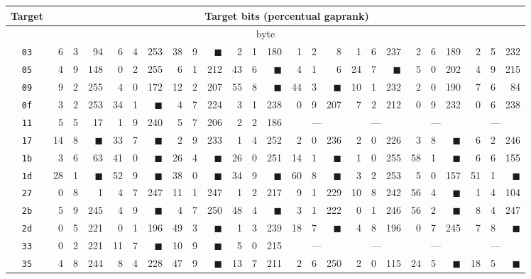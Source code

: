 \begin{tabular}{| c | r@{.} l@{\quad}r | r@{.} l@{\quad}r | r@{.} l@{\quad}r | r@{.} l@{\quad}r | r@{.} l@{\quad}r | r@{.} l@{\quad}r | r@{.} l@{\quad}r | r@{.} l@{\quad}r |}
	\hline
	Target & \multicolumn{24}{c|}{Target bits (percentual gap\quad rank)} \\
	\hline
	\hline
	\multicolumn{25}{|c|}{\nth{1} byte} \\
	\hline
	{\tt 03}&6&3&94&6&4&253&38&9&{$\blacksquare$}&2&1&180&1&2&8&1&6&237&2&6&189&2&5&232\\
	\hline
	{\tt 05}&4&9&148&0&2&255&6&1&212&43&6&{$\blacksquare$}&4&1&6&24&7&{$\blacksquare$}&5&0&202&4&9&215\\
	\hline
	{\tt 09}&9&2&255&4&0&172&12&2&207&55&8&{$\blacksquare$}&44&3&{$\blacksquare$}&10&1&232&2&0&190&7&6&84\\
	\hline
	{\tt 0f}&3&2&253&34&1&{$\blacksquare$}&4&7&224&3&1&238&0&9&207&7&2&212&0&9&232&0&6&238\\
	\hline
	{\tt 11}&5&5&17&1&9&240&5&7&206&2&2&186&\multicolumn{3}{c|}{---}&\multicolumn{3}{c|}{---}&\multicolumn{3}{c|}{---}&\multicolumn{3}{c|}{---}\\
	\hline
	{\tt 17}&14&8&{$\blacksquare$}&33&7&{$\blacksquare$}&2&9&233&1&4&252&2&0&236&2&0&226&3&8&{\weak$\blacksquare$}&6&2&246\\
	\hline
	{\tt 1b}&3&6&63&41&0&{$\blacksquare$}&26&4&{$\blacksquare$}&26&0&251&14&1&{$\blacksquare$}&1&0&255&58&1&{$\blacksquare$}&6&6&155\\
	\hline
	{\tt 1d}&28&1&{$\blacksquare$}&52&9&{$\blacksquare$}&38&0&{$\blacksquare$}&34&9&{$\blacksquare$}&60&8&{$\blacksquare$}&3&2&253&5&0&157&51&1&{$\blacksquare$}\\
	\hline
	{\tt 27}&0&8&1&4&7&247&11&1&247&1&2&217&9&1&229&10&8&242&56&4&{$\blacksquare$}&1&4&104\\
	\hline
	{\tt 2b}&5&9&245&4&9&{\weak$\blacksquare$}&4&7&250&48&4&{$\blacksquare$}&3&1&222&0&1&246&56&2&{$\blacksquare$}&8&4&247\\
	\hline
	{\tt 2d}&0&5&221&0&1&196&49&3&{$\blacksquare$}&1&3&239&18&7&{$\blacksquare$}&4&8&196&0&7&245&7&8&{\weak$\blacksquare$}\\
	\hline
	{\tt 33}&0&2&221&11&7&{$\blacksquare$}&10&9&{$\blacksquare$}&5&0&215&\multicolumn{3}{c|}{---}&\multicolumn{3}{c|}{---}&\multicolumn{3}{c|}{---}&\multicolumn{3}{c|}{---}\\
	\hline
	{\tt 35}&4&8&244&8&4&228&47&9&{$\blacksquare$}&13&7&211&2&6&250&2&0&115&24&5&{$\blacksquare$}&18&5&{$\blacksquare$}\\

\end{tabular}
